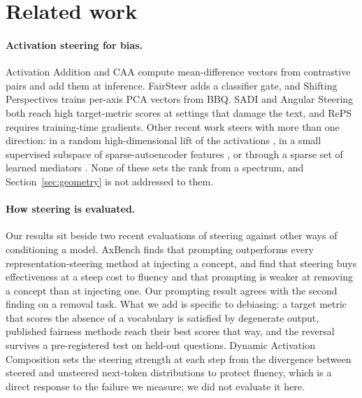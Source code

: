 \section{Related work}
\label{sec:related}

\paragraph{Activation steering for bias.} Activation Addition
\citep{turner2023activation} and CAA \citep{rimsky2024steering} compute mean-difference
vectors from contrastive pairs and add them at inference. FairSteer
\citep{li2025fairsteer} adds a classifier gate, and Shifting Perspectives
\citep{siddique2025shifting} trains per-axis PCA vectors from BBQ. SADI
\citep{wang2025sadi} and Angular Steering \citep{vu2025angular} both reach high
target-metric scores at settings that damage the text, and RePS \citep{wu2025reps}
requires training-time gradients. Other recent work steers with more than one direction:
in a random high-dimensional lift of the activations \citep{pham2026hidra}, in a small
supervised subspace of sparse-autoencoder features \citep{he2025saessv}, or through a
sparse set of learned mediators \citep{doan-etal-2026-causal}. None of these sets the
rank from a spectrum, and Section~\ref{sec:geometry} is not addressed to them.

\paragraph{How steering is evaluated.} Our results sit beside two recent evaluations of
steering against other ways of conditioning a model. AxBench
\citep{wu2025axbench} finds that prompting outperforms every representation-steering
method at injecting a concept, and \citet{macocco2026tradeoff} find that steering buys
effectiveness at a steep cost to fluency and that prompting is weaker at removing a
concept than at injecting one. Our prompting result agrees with the second finding on a
removal task. What we add is specific to debiasing: a target metric that scores the
absence of a vocabulary is satisfied by degenerate output, published fairness methods
reach their best scores that way, and the reversal survives a pre-registered test on
held-out questions. Dynamic Activation Composition \citep{scalena-etal-2024-multi} sets the
steering strength at each step from the divergence between steered and unsteered
next-token distributions to protect fluency, which is a direct response to the failure
we measure; we did not evaluate it here.

